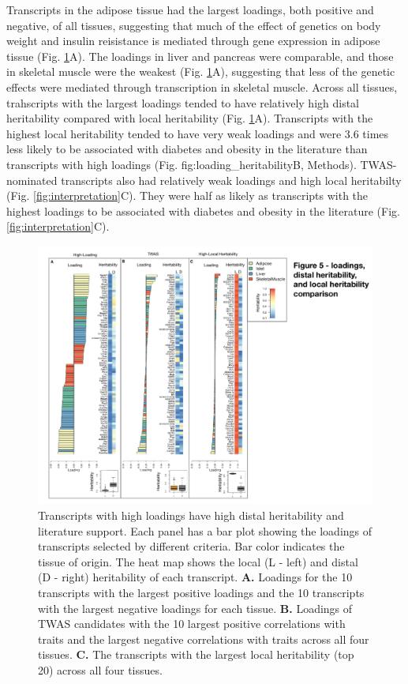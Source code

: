 \documentclass[
]{article}
\begin{document}
Transcripts in the adipose tissue had the largest loadings, both
positive and negative, of all tissues, suggesting that much of the
effect of genetics on body weight and insulin reisistance is mediated
through gene expression in adipose tissue (Fig.
\ref{fig:loading_heritability}A). The loadings in liver and pancreas
were comparable, and those in skeletal muscle were the weakest (Fig.
\ref{fig:loading_heritability}A), suggesting that less of the genetic
effects were mediated through transcription in skeletal muscle. Across
all tissues, trahscripts with the largest loadings tended to have
relatively high distal heritability compared with local heritability
(Fig. \ref{fig:loading_heritability}A). Transcripts with the highest
local heritability tended to have very weak loadings and were 3.6 times
less likely to be associated with diabetes and obesity in the literature
than transcripts with high loadings (Fig. fig:loading\_heritabilityB,
Methods). TWAS-nominated transcripts also had relatively weak loadings
and high local heritabilty (Fig. \ref{fig:interpretation}C). They were
half as likely as transcripts with the highest loadings to be associated
with diabetes and obesity in the literature (Fig.
\ref{fig:interpretation}C).

\begin{figure}[ht!]
\includegraphics[width=\textwidth]{Figures/Fig5_loading_heritability.pdf} 
\caption{Transcripts with high loadings have high distal heritability
and literature support. Each panel has a bar plot showing the loadings 
of transcripts selected by different criteria. Bar color indicates the 
tissue of origin. The heat map shows the local (L - left) and distal 
(D - right) heritability of each transcript. \textbf{A.} Loadings for 
the 10 transcripts with the largest positive loadings and the 10 
transcripts with the largest negative loadings for each tissue. 
\textbf{B.} Loadings of TWAS candidates with the 10 largest positive 
correlations with traits and the largest negative correlations with 
traits across all four tissues. \textbf{C.} The transcripts with the 
largest local heritability (top 20) across all four tissues.
}
\label{fig:loading_heritability}
\end{figure}
\end{document}
